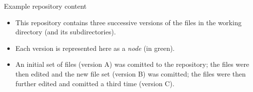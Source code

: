 \documentclass[usenames,dvipsnames]{beamer}
\begin{document}
\begin{frame}{Example repository content}
  \begin{figure}
    \begin{center}
    \end{center}
  \end{figure}
  \begin{block}{}
    \begin{itemize}
      \item{This repository contains three successive versions of the files in the working directory (and its subdirectories).}
      \item{Each version is represented here as a \textit{node} (in green).}
      \item{An initial set of files (version A) was comitted to the repository; the files were then edited and the new file set (version B) was comitted; the files were then further edited and comitted a third time (version C).}
    \end{itemize}
  \end{block}
\end{frame}
\end{document}
